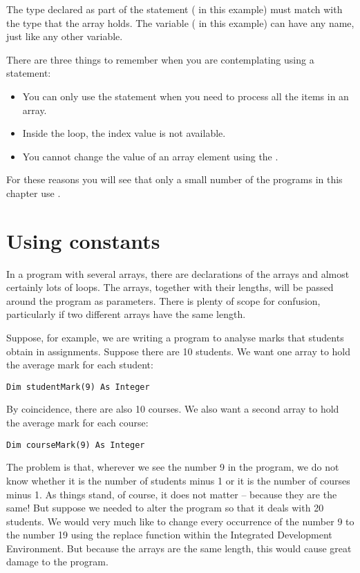 		The type declared as part of the  statement ( in this example) must match with the type that the array holds. The variable ( in this example) can have any name, just like any other variable.
		
		There are three things to remember when you are contemplating using a  statement:
		\begin{itemize}
      \item You can only use the  statement when you need to process all the items in an array.
      \item Inside the loop, the index value is not available.
      \item You cannot change the value of an array element using the .
		\end{itemize}
		For these reasons you will see that only a small number of the programs in this chapter use .


	\section{Using constants}
		In a program with several arrays, there are declarations of the arrays and almost certainly lots of  loops. The arrays, together with their lengths, will be passed around the program as parameters. There is plenty of scope for confusion, particularly if two different arrays have the same length.
		
		Suppose, for example, we are writing a program to analyse marks that students obtain in assignments. Suppose there are 10 students. We want one array to hold the average mark for each student:
		\begin{lstlisting}
Dim studentMark(9) As Integer
		\end{lstlisting}
		By coincidence, there are also 10 courses. We also want a second array to hold the average mark for each course:
		\begin{lstlisting}
Dim courseMark(9) As Integer
		\end{lstlisting}
		The problem is that, wherever we see the number 9 in the program, we do not know whether it is the number of students minus 1 or it is the number of courses minus 1. As things stand, of course, it does not matter – because they are the same! But suppose we needed to alter the program so that it deals with 20 students. We would very much like to change every occurrence of the number 9 to the number 19 using the replace function within the Integrated Development Environment. But because the arrays are the same length, this would cause great damage to the program.
		
